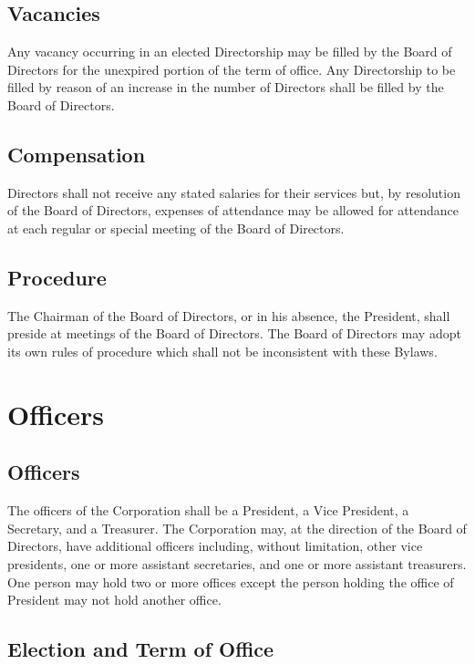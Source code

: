 \documentclass[12pt]{report}
\begin{document}
\section{Vacancies}

Any vacancy occurring in an elected Directorship may be filled by the Board of Directors for the unexpired portion of the term of office. Any Directorship to be filled by reason of an increase in the number of Directors shall be filled by the Board of Directors.

\section{Compensation}

Directors shall not receive any stated salaries for their services but, by resolution of the Board of Directors, expenses of attendance may be allowed for attendance at each regular or special meeting of the Board of Directors.

\section{Procedure}

The Chairman of the Board of Directors, or in his absence, the President, shall preside at meetings of the Board of Directors. The Board of Directors may adopt its own rules of procedure which shall not be inconsistent with these Bylaws.

\chapter{Officers}

\section{Officers}

The officers of the Corporation shall be a President, a Vice President, a Secretary, and a Treasurer. The Corporation may, at the direction of the Board of Directors, have additional officers including, without limitation, other vice presidents, one or more assistant secretaries, and one or more assistant treasurers. One person may hold two or more offices except the person holding the office of President may not hold another office.

\section{Election and Term of Office}
\end{document}
